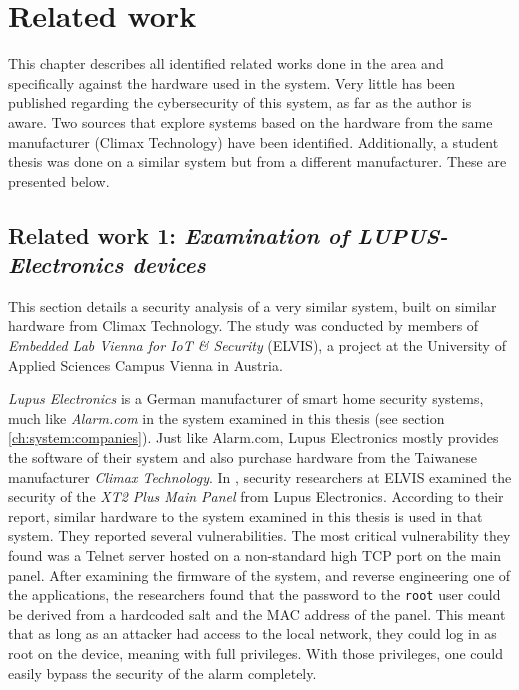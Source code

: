 \chapter{Related work} \label{ch:related-work}
This chapter describes all identified related works done in the area and specifically against the hardware used in the system. Very little has been published regarding the cybersecurity of this system, as far as the author is aware. Two sources that explore systems based on the hardware from the same manufacturer (Climax Technology) have been identified. Additionally, a student thesis was done on a similar system but from a different manufacturer. These are presented below.

\section{Related work 1: \textit{Examination of LUPUS-Electronics devices}} \label{ch:related-work:lupus}
This section details a security analysis of a very similar system, built on similar hardware from Climax Technology. The study was conducted by members of \textit{Embedded Lab Vienna for IoT \& Security} (ELVIS), a project at the University of Applied Sciences Campus Vienna in Austria.

\textit{Lupus Electronics} is a German manufacturer of smart home security systems, much like \textit{Alarm.com} in the system examined in this thesis (see section \ref{ch:system:companies}). Just like Alarm.com, Lupus Electronics mostly provides the software of their system and also purchase hardware from the Taiwanese manufacturer \textit{Climax Technology}. In \citeyear{labvienna}, security researchers at ELVIS examined the security of the \textit{XT2 Plus Main Panel} from Lupus Electronics. According to their report, similar hardware to the system examined in this thesis is used in that system. They reported several vulnerabilities. The most critical vulnerability they found was a Telnet server hosted on a non-standard high TCP port on the main panel. After examining the firmware of the system, and reverse engineering one of the applications, the researchers found that the password to the \texttt{root} user could be derived from a hardcoded salt and the MAC address of the panel. This meant that as long as an attacker had access to the local network, they could log in as root on the device, meaning with full privileges. With those privileges, one could easily bypass the security of the alarm completely.

